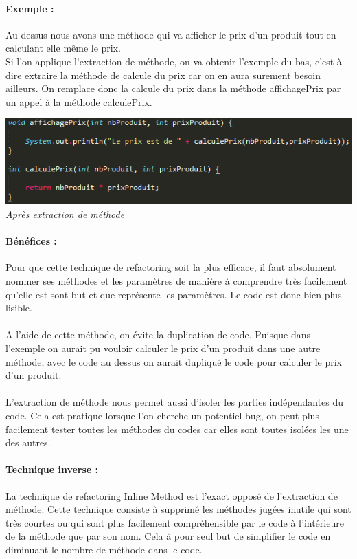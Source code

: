 \documentclass[a4paper,twoside,12pt,openright]{report}
\begin{document}
\paragraph{Exemple :} 
Au dessus nous avons une méthode qui va afficher le prix d'un produit tout en calculant elle même le prix.\\
Si l'on applique l'extraction de méthode, on va obtenir l'exemple du bas, c'est à dire extraire la méthode de calcule du prix car on en aura surement besoin ailleurs. On remplace donc la calcule du prix dans la méthode affichagePrix par un appel à la méthode calculePrix.\\
\begin{center}
\includegraphics[scale=1]{Image/Extraction_Methode2.png}\\
\itshape{Après extraction de méthode}
\end{center}
\paragraph{Bénéfices :}
Pour que cette technique de refactoring soit la plus efficace, il faut absolument nommer ses méthodes et les paramètres de manière à comprendre très facilement qu'elle est sont but et que représente les paramètres. Le code est donc bien plus lisible.\\\\
A l'aide de cette méthode, on évite la duplication de code. Puisque dans l'exemple on aurait pu vouloir calculer le prix d'un produit dans une autre méthode, avec le code au dessus on aurait dupliqué le code pour calculer le prix d'un produit.\\\\
L'extraction de méthode nous permet aussi d'isoler les parties indépendantes du code. Cela est pratique lorsque l'on cherche un potentiel bug, on peut plus facilement tester toutes les méthodes du codes car elles sont toutes isolées les une des autres.

\paragraph{Technique inverse :}
La technique de refactoring Inline Method est l'exact opposé de l'extraction de méthode. Cette technique consiste à supprimé les méthodes jugées inutile qui sont très courtes ou qui sont plus facilement compréhensible par le code à l'intérieure de la méthode que par son nom. Cela à pour seul but de simplifier le code en diminuant le nombre de méthode dans le code.\\
\end{document}
